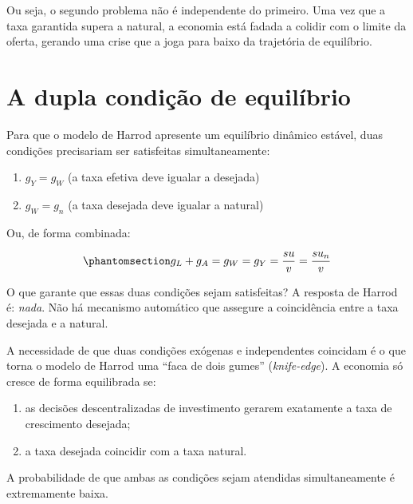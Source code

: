 \documentclass[
  brazilian,
  letterpaper,
  DIV=11,
  numbers=noendperiod]{scrreprt}
\providecommand{\tightlist}{%
  \setlength{\itemsep}{0pt}\setlength{\parskip}{0pt}}
\begin{document}
Ou seja, o segundo problema não é independente do primeiro. Uma vez que
a taxa garantida supera a natural, a economia está fadada a colidir com
o limite da oferta, gerando uma crise que a joga para baixo da
trajetória de equilíbrio.

\section{A dupla condição de equilíbrio}\label{sec-dupla-condicao}

Para que o modelo de Harrod apresente um equilíbrio dinâmico estável,
duas condições precisariam ser satisfeitas simultaneamente:

\begin{enumerate}
\def\labelenumi{\arabic{enumi}.}
\tightlist
\item
  \(g_Y = g_W\) (a taxa efetiva deve igualar a desejada)
\item
  \(g_W = g_n\) (a taxa desejada deve igualar a natural)
\end{enumerate}

Ou, de forma combinada:

\begin{equation}\protect\phantomsection\label{eq-dupla-condicao}{g_L + g_A = g_W = g_Y = \frac{s u}{v} = \frac{s u_n}{v}}\end{equation}

O que garante que essas duas condições sejam satisfeitas? A resposta de
Harrod é: \emph{nada}. Não há mecanismo automático que assegure a
coincidência entre a taxa desejada e a natural.

\begin{tcolorbox}[enhanced jigsaw, arc=.35mm, bottomrule=.15mm, bottomtitle=1mm, breakable, colback=white, colbacktitle=quarto-callout-important-color!10!white, colframe=quarto-callout-important-color-frame, coltitle=black, left=2mm, leftrule=.75mm, opacityback=0, opacitybacktitle=0.6, rightrule=.15mm, title=\textcolor{quarto-callout-important-color}{\faExclamation}\hspace{0.5em}{A ``faca de dois gumes'' de Harrod}, titlerule=0mm, toprule=.15mm, toptitle=1mm]

A necessidade de que duas condições exógenas e independentes coincidam é
o que torna o modelo de Harrod uma ``faca de dois gumes''
(\emph{knife-edge}). A economia só cresce de forma equilibrada se:

\begin{enumerate}
\def\labelenumi{\arabic{enumi}.}
\tightlist
\item
  as decisões descentralizadas de investimento gerarem exatamente a taxa
  de crescimento desejada;
\item
  a taxa desejada coincidir com a taxa natural.
\end{enumerate}

A probabilidade de que ambas as condições sejam atendidas
simultaneamente é extremamente baixa.

\end{tcolorbox}
\end{document}
